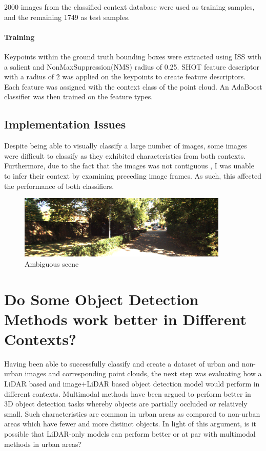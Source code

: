 2000 images from the classified context database were used as training samples, and the remaining 1749 as test samples.
\paragraph{Training} Keypoints within the ground truth bounding boxes were extracted using  ISS with a salient and NonMaxSuppression(NMS) radius of 0.25. SHOT feature descriptor with a radius of 2 was applied on the keypoints to create feature descriptors. Each feature was assigned with the context class of the point cloud. An AdaBoost classifier was then trained on the feature types. 
\subsection{Implementation Issues} 

Despite being able to visually classify a large number of images, some images were difficult to classify as they exhibited characteristics from both contexts. Furthermore, due to the fact that the images was not contiguous , I was unable to infer their context by examining preceding image frames. As such, this affected the performance of both classifiers. 
\begin{figure}[H]%
	\centering
	\includegraphics[width=10cm]{images/ambiguous.png}%
	\caption{Ambiguous scene}%
	\label{fig:ambiguous}%
\end{figure}

\section{ Do Some Object Detection Methods work better in Different Contexts?}

Having been able to successfully classify and create a dataset of urban and non-urban images and corresponding point clouds, the next step was evaluating how a LiDAR based and image+LiDAR based object detection model would perform in different contexts. Multimodal methods have been argued to perform better in 3D object detection tasks whereby objects are partially occluded or relatively small. Such characteristics are common in urban areas as compared to non-urban areas which have fewer and more distinct objects. In light of this argument, is it possible that LiDAR-only models can perform better or at par with multimodal methods in urban areas?

